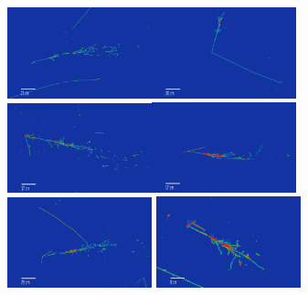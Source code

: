 \begin{figure}[htb]
    \begin{subfigure}{\textwidth}
    \includegraphics[width=0.46\textwidth]{NueCCsel/Images/evd/nue_5161_8_447}\hfill \includegraphics[width=0.46\textwidth]{NueCCsel/Images/evd/nue_5360_0_45}
    \vspace{1mm}
    \includegraphics[width=0.46\textwidth]{NueCCsel/Images/evd/nue_5444_87_1}\hfill \includegraphics[width=0.46\textwidth]{NueCCsel/Images/evd/nue_5583_13_692}
    \vspace{1mm}
    \includegraphics[width=0.46\textwidth]{NueCCsel/Images/evd/nue_5607_15_796} \hfill \includegraphics[width=0.46\textwidth]{NueCCsel/Images/evd/nue_5729_121_6086}

\end{subfigure}
\end{figure}
